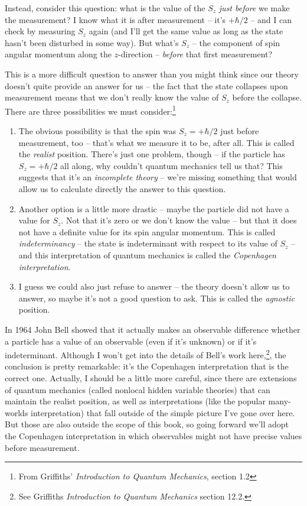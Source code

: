 Instead, consider this question:  what is the value of the $S_z$ \emph{just before} we make the measurement?  I know what it is after measurement -- it's $+\hbar/2$ -- and I can check by measuring $S_z$ again (and I'll get the same value as long as the state hasn't been disturbed in some way).  But what's $S_z$ -- the component of spin angular momentum along the $z$-direction -- \emph{before} that first measurement?

This is a more difficult question to answer than you might think since our theory doesn't quite provide an answer for us -- the fact that the state collapses upon measurement means that we don't really know the value of $S_z$ before the collapse.  There are three possibilities we must consider:\footnote{From Griffiths' \emph{Introduction to Quantum Mechanics}, section 1.2}
\begin{enumerate}
\item The obvious possibility is that the spin was $S_z  = +\hbar/2$ just before measurement, too -- that's what we measure it to be, after all. This is called the \emph{realist} position.  There's just one problem, though -- if the particle has $S_z = +\hbar/2$ all along, why couldn't quantum mechanics tell us that?  This suggests that it's an \emph{incomplete theory} -- we're missing something that would allow us to calculate directly the answer to this question.
\item Another option is a little more drastic -- maybe the particle did not have a value for $S_z$.  Not that it's zero or we don't know the value -- but that it does not have a definite value for its spin angular momentum.  This is called \emph{indeterminancy} -- the state is indeterminant with respect to its value of $S_z$ -- and this interpretation of quantum mechanics is called the \emph{Copenhagen interpretation}.  
\item I guess we could also just refuse to answer -- the theory doesn't allow us to answer, so maybe it's not a good question to ask.  This is called the \emph{agnostic} position.
\end{enumerate}

In 1964 John Bell showed that it actually makes an observable difference whether a particle has a value of an observable (even if it's unknown) or if it's indeterminant.  Although I won't get into the details of Bell's work here,\footnote{See Griffiths \emph{Introduction to Quantum Mechanics} section 12.2.}, the conclusion is pretty remarkable: it's the Copenhagen interpretation that is the correct one.  Actually, I should be a little more careful, since there are extensions of quantum mechanics (called nonlocal hidden variable theories) that can maintain the realist position, as well as interpretations (like the popular many-worlds interpretation) that fall outside of the simple picture I've gone over here.  But those are also outside the scope of this book, so going forward we'll adopt the Copenhagen interpretation in which observables might not have precise values before measurement.



